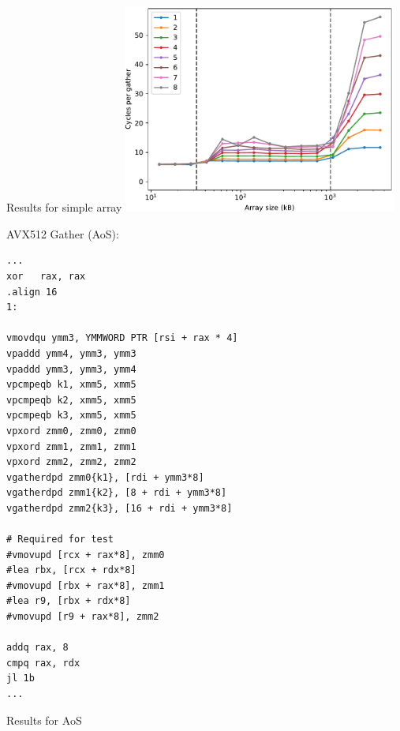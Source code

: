 \documentclass[aspectratio=169,t]{beamer}
\begin{document}
  \begin{frame}[fragile]{Results for simple array}
    \includegraphics[width=9cm]{gather_casclakesp2_results.pdf}
  \end{frame}

  \begin{frame}[fragile]{AVX512 Gather (AoS):}
    \vspace{-17.5pt}
    \begin{lstlisting}[language={[x64]Assembler},basicstyle=\tt\tiny]
...
xor   rax, rax
.align 16
1:

vmovdqu ymm3, YMMWORD PTR [rsi + rax * 4]
vpaddd ymm4, ymm3, ymm3
vpaddd ymm3, ymm3, ymm4
vpcmpeqb k1, xmm5, xmm5
vpcmpeqb k2, xmm5, xmm5
vpcmpeqb k3, xmm5, xmm5
vpxord zmm0, zmm0, zmm0
vpxord zmm1, zmm1, zmm1
vpxord zmm2, zmm2, zmm2
vgatherdpd zmm0{k1}, [rdi + ymm3*8]
vgatherdpd zmm1{k2}, [8 + rdi + ymm3*8]
vgatherdpd zmm2{k3}, [16 + rdi + ymm3*8]

# Required for test
#vmovupd [rcx + rax*8], zmm0
#lea rbx, [rcx + rdx*8]
#vmovupd [rbx + rax*8], zmm1
#lea r9, [rbx + rdx*8]
#vmovupd [r9 + rax*8], zmm2

addq rax, 8
cmpq rax, rdx
jl 1b
...
    \end{lstlisting}
  \end{frame}

  \begin{frame}[fragile]{Results for AoS}
  \end{frame}
\end{document}

